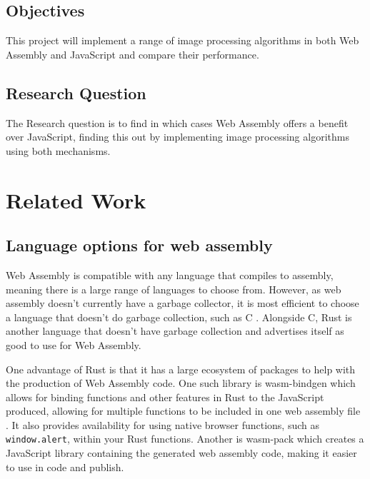 \documentclass[12pt,a4paper]{article}
\begin{document}
\subsection{Objectives}

This project will implement a range of image processing algorithms in both Web Assembly and JavaScript and compare their performance.


\subsection{Research Question}

The Research question is to find in which cases Web Assembly offers a benefit over JavaScript, finding this out by implementing image processing algorithms using both mechanisms.





\section{Related Work}

\subsection{Language options for web assembly}

Web Assembly is compatible with any language that compiles to assembly, meaning there is a large range of languages to choose from. However, as web assembly doesn't currently have a garbage collector, it is most efficient to choose a language that doesn't do garbage collection, such as C \cite{haas2017bringing}. Alongside C, Rust is another language that doesn't have garbage collection and advertises itself as good to use for Web Assembly.

One advantage of Rust is that it has a large ecosystem of packages to help with the production of Web Assembly code. One such library is wasm-bindgen which allows for binding functions and other features in Rust to the JavaScript produced, allowing for multiple functions to be included in one web assembly file \cite{wasmbindgen}. It also provides availability for using native browser functions, such as \texttt{window.alert}, within your Rust functions. Another is wasm-pack which creates a JavaScript library containing the generated web assembly code, making it easier to use in code and publish.

\end{document}
